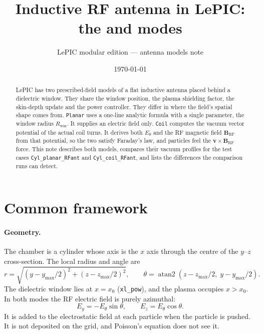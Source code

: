 \documentclass[11pt,a4paper]{article}
\title{Inductive RF antenna in LePIC:\\ the \code{Planar} and \code{Coil} modes}
\author{LePIC modular edition --- antenna models note}
\date{\today}
\newcommand{\rwin}{R_{\mathrm{win}}}
\newcommand{\code}[1]{\texttt{#1}}
\begin{document}
\maketitle

\begin{abstract}
LePIC has two prescribed-field models of a flat inductive antenna placed
behind a dielectric window. They share the window position, the plasma
shielding factor, the skin-depth update and the power controller. They differ
in where the field's spatial shape comes from. \code{Planar} uses a one-line
analytic formula with a single parameter, the window radius $\rwin$. It
supplies an electric field only. \code{Coil} computes the vacuum vector
potential of the actual coil turns. It derives both $E_\theta$ and the RF
magnetic field $\mathbf{B}_{\mathrm{RF}}$ from that potential, so the two
satisfy Faraday's law, and particles feel the $\mathbf{v}\times\mathbf{B}_{\mathrm{RF}}$ force. This note
describes both models, compares their vacuum profiles for the test cases
\code{Cyl\_planar\_RFant} and \code{Cyl\_coil\_RFant}, and lists the
differences the comparison runs can detect.
\end{abstract}

\section{Common framework}

\paragraph{Geometry.} The chamber is a cylinder whose axis is the $x$ axis
through the centre of the $y$--$z$ cross-section. The local radius and angle
are
\begin{equation}
  r = \sqrt{(y-y_{\max}/2)^2 + (z-z_{\max}/2)^2}, \qquad
  \theta = \operatorname{atan2}\!\left(z-z_{\max}/2,\; y-y_{\max}/2\right).
\end{equation}
The dielectric window lies at $x = x_0$ (\code{xl\_pow}), and the plasma
occupies $x > x_0$. In both modes the RF electric field is purely azimuthal:
\begin{equation}
  E_y = -E_\theta \sin\theta, \qquad E_z = E_\theta \cos\theta .
\end{equation}
It is added to the electrostatic field at each particle when the particle is
pushed. It is not deposited on the grid, and Poisson's equation does not see
it.
\end{document}
